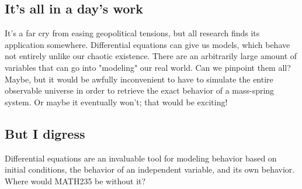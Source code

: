 \documentclass[10pt]{extarticle}
\begin{document}
\begin{multicols}{2}
\subsection{It's all in a day's work}

It's a far cry from easing geopolitical tensions, but all research
finds its application somewhere. Differential equations  can give us models,
which behave not entirely unlike our chaotic existence. There are an
arbitrarily large amount of variables that can go into "modeling" our real
world. Can we pinpoint them all? Maybe, but it would be awfully inconvenient to
have to simulate the entire observable universe in order to retrieve the exact
behavior of a mass-spring system. Or maybe it eventually won't; that would be
exciting!


\subsection{But I digress}

Differential equations are an invaluable tool for modeling behavior based on
initial conditions, the behavior of an independent variable, and its own
behavior. Where would MATH235 be without it?

\end{multicols}


\end{document}
